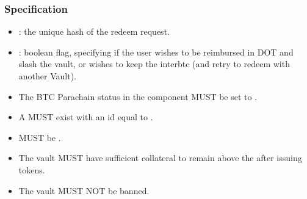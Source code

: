 \documentclass[a4paper,10pt,english]{sphinxmanual}
\begin{document}
\subsubsection{Specification}
\label{\detokenize{spec/redeem:id13}}


\begin{itemize}
\item {} 
: the unique hash of the redeem request.

\item {} 
: boolean flag, specifying if the user wishes to be reimbursed in DOT and slash the vault, or wishes to keep the interbtc (and retry to redeem with another Vault).

\end{itemize}



\begin{itemize}
\item {} 
The BTC Parachain status in the {\hyperref[\detokenize{spec/security:security}]{}} component MUST be set to .

\item {} 
A  MUST exist with an id equal to .

\item {} 
 MUST be .

\item {} 
The vault MUST have sufficient collateral to remain above the {\hyperref[\detokenize{spec/vault-registry:securecollateralthreshold}]{}} after issuing  tokens.

\item {} 
The vault MUST NOT be banned.

\end{itemize}
\end{document}
